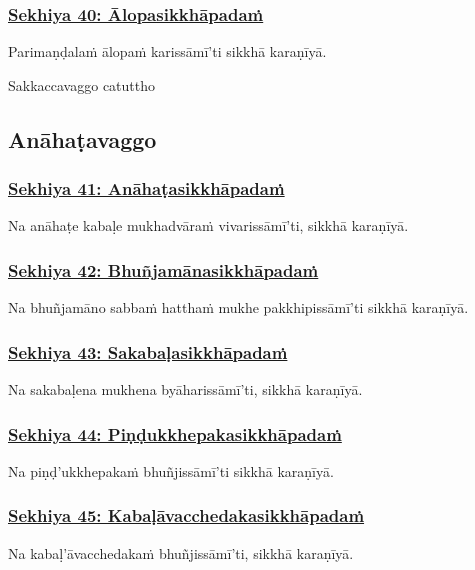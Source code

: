 \subsubsection*{\hyperref[training40]{Sekhiya 40: Ālopasikkhāpadaṁ}}
\label{sekh40}
Parimaṇḍalaṁ ālopaṁ karissāmī'ti sikkhā karaṇīyā.

\begin{center}
  Sakkaccavaggo catuttho
\end{center}

\subsection{Anāhaṭavaggo}
\vspace{0.2cm}

\subsubsection*{\hyperref[training41]{Sekhiya 41: Anāhaṭasikkhāpadaṁ}}
\label{sekh41}
Na anāhaṭe kabaḷe mukhadvāraṁ vivarissāmī'ti, sikkhā karaṇīyā.

\subsubsection*{\hyperref[training42]{Sekhiya 42: Bhuñjamānasikkhāpadaṁ}}
\label{sekh42}
Na bhuñjamāno sabbaṁ hatthaṁ mukhe pakkhipissāmī'ti sikkhā karaṇīyā.

\subsubsection*{\hyperref[training43]{Sekhiya 43: Sakabaḷasikkhāpadaṁ}}
\label{sekh43}
Na sakabaḷena mukhena byāharissāmī'ti, sikkhā karaṇīyā.

\subsubsection*{\hyperref[training44]{Sekhiya 44: Piṇḍukkhepakasikkhāpadaṁ}}
\label{sekh44}
Na piṇḍ'ukkhepakaṁ bhuñjissāmī'ti sikkhā karaṇīyā.

\subsubsection*{\hyperref[training45]{Sekhiya 45: Kabaḷāvacchedakasikkhāpadaṁ}}
\label{sekh45}
Na kabaḷ'āvacchedakaṁ bhuñjissāmī'ti, sikkhā karaṇīyā.

